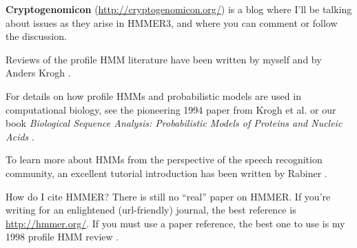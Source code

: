 \textbf{Cryptogenomicon} (\url{http://cryptogenomicon.org/}) is a blog
where I'll be talking about issues as they arise in HMMER3, and where
you can comment or follow the discussion.

Reviews of the profile HMM literature have been written by myself
\citep{Eddy96,Eddy98} and by Anders Krogh \citep{Krogh98}.

For details on how profile HMMs and probabilistic models are used in
computational biology, see the pioneering 1994 paper from Krogh et
al. \citep{Krogh94} or our book \emph{Biological Sequence Analysis:
Probabilistic Models of Proteins and Nucleic Acids} \citep{Durbin98}.

To learn more about HMMs from the perspective of the speech
recognition community, an excellent tutorial introduction has been
written by Rabiner \citep{Rabiner89}.

\begin{srefaq}{How do I cite HMMER?}
There is still no ``real'' paper on HMMER. If you're writing for an
enlightened (url-friendly) journal, the best reference is
\url{http://hmmer.org/}.
If you must use a paper reference, the best one to use is my 1998
profile HMM review \citep{Eddy98}.
\end{srefaq}















  









